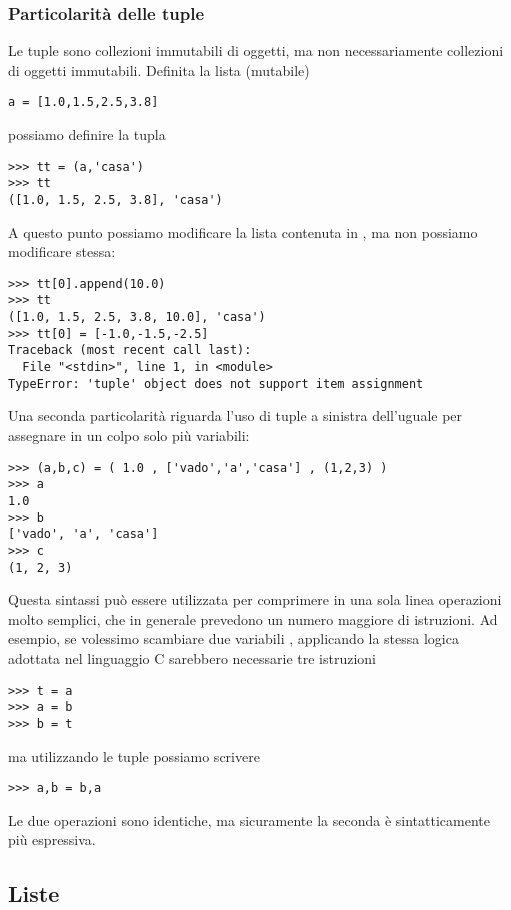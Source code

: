 \subsubsection{Particolarit\`a delle tuple}

Le tuple sono collezioni immutabili di oggetti, ma non necessariamente
collezioni di oggetti immutabili. Definita la lista (mutabile)
\begin{verbatim}
a = [1.0,1.5,2.5,3.8]
\end{verbatim}
possiamo definire la tupla
\begin{verbatim}
>>> tt = (a,'casa')
>>> tt
([1.0, 1.5, 2.5, 3.8], 'casa')
\end{verbatim}
A questo punto possiamo modificare la lista contenuta in , ma
non possiamo modificare  stessa:
\begin{verbatim}
>>> tt[0].append(10.0)
>>> tt
([1.0, 1.5, 2.5, 3.8, 10.0], 'casa')
>>> tt[0] = [-1.0,-1.5,-2.5]
Traceback (most recent call last):
  File "<stdin>", line 1, in <module>
TypeError: 'tuple' object does not support item assignment
\end{verbatim}

Una seconda particolarit\`a riguarda l'uso di tuple a sinistra
dell'uguale per assegnare in un colpo solo pi\`u variabili:
\begin{verbatim}
>>> (a,b,c) = ( 1.0 , ['vado','a','casa'] , (1,2,3) )
>>> a
1.0
>>> b
['vado', 'a', 'casa']
>>> c
(1, 2, 3)
\end{verbatim}
Questa sintassi pu\`o essere utilizzata per comprimere in una sola
linea operazioni molto semplici, che in generale prevedono un numero
maggiore di istruzioni. Ad esempio, se volessimo scambiare due
variabili ,  applicando la stessa logica adottata
nel linguaggio C sarebbero necessarie tre istruzioni
\begin{verbatim}
>>> t = a
>>> a = b
>>> b = t
\end{verbatim}
ma utilizzando le tuple possiamo scrivere
\begin{verbatim}
>>> a,b = b,a
\end{verbatim}
Le due operazioni sono identiche, ma sicuramente la seconda \`e
sintatticamente pi\`u espressiva.

\subsection{Liste}

